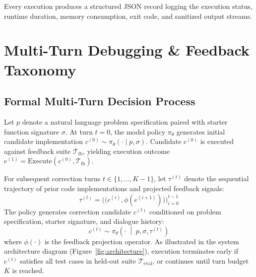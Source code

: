 \documentclass[letterpaper]{article} %
\begin{document}
Every execution produces a structured JSON record logging the execution status, runtime duration, memory consumption, exit code, and sanitized output streams.

\section{Multi-Turn Debugging \& Feedback Taxonomy}
\label{sec:debugging}

\subsection{Formal Multi-Turn Decision Process}
Let $p$ denote a natural language problem specification paired with starter function signature $\sigma$. At turn $t=0$, the model policy $\pi_\theta$ generates initial candidate implementation $c^{(0)} \sim \pi_\theta(\cdot \mid p, \sigma)$. Candidate $c^{(0)}$ is executed against feedback suite $\mathcal{T}_{\text{fb}}$, yielding execution outcome $e^{(1)} = \text{Execute}(c^{(0)}, \mathcal{T}_{\text{fb}})$.

For subsequent correction turns $t \in \{1, \dots, K-1\}$, let $\tau^{(t)}$ denote the sequential trajectory of prior code implementations and projected feedback signals:
\begin{equation}
\tau^{(t)} = \Big( \big(c^{(i)}, \phi(e^{(i+1)})\big) \Big)_{i=0}^{t-1}
\end{equation}
The policy generates correction candidate $c^{(t)}$ conditioned on problem specification, starter signature, and dialogue history:
\begin{equation}
c^{(t)} \sim \pi_\theta\left(\cdot \;\middle|\; p, \sigma, \tau^{(t)}\right)
\end{equation}
where $\phi(\cdot)$ is the feedback projection operator. As illustrated in the system architecture diagram (Figure~\ref{fig:architecture}), execution terminates early if $c^{(t)}$ satisfies all test cases in held-out suite $\mathcal{T}_{\text{eval}}$, or continues until turn budget $K$ is reached.
\end{document}
